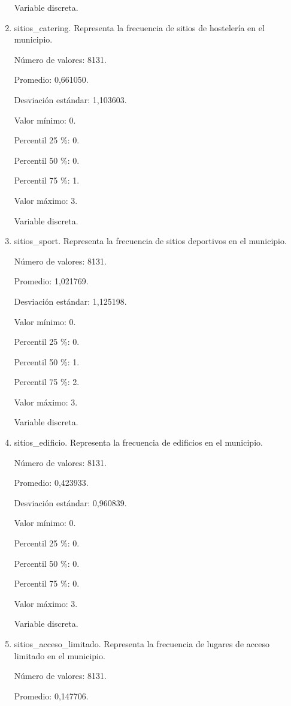 \begin{enumerate}
	Variable discreta.

	\item sitios\_catering. Representa la frecuencia de sitios de hostelería en el municipio.
	
	Número de valores: 8131.
	
	Promedio: 0,661050.
	
	Desviación estándar: 1,103603.
	
	Valor mínimo: 0.
	
	Percentil 25 \%: 0.
	
	Percentil 50 \%: 0.
	
	Percentil 75 \%: 1.
	
	Valor máximo: 3.
	
	Variable discreta.

	\item sitios\_sport. Representa la frecuencia de sitios deportivos en el municipio.
	
	Número de valores: 8131.
	
	Promedio: 1,021769.
	
	Desviación estándar: 1,125198.
	
	Valor mínimo: 0.
	
	Percentil 25 \%: 0.
	
	Percentil 50 \%: 1.
	
	Percentil 75 \%: 2.
	
	Valor máximo: 3.
	
	Variable discreta.

	\item sitios\_edificio. Representa la frecuencia de edificios en el municipio.
	
	Número de valores: 8131.
	
	Promedio: 0,423933.
	
	Desviación estándar: 0,960839.
	
	Valor mínimo: 0.
	
	Percentil 25 \%: 0.
	
	Percentil 50 \%: 0.
	
	Percentil 75 \%: 0.
	
	Valor máximo: 3.
	
	Variable discreta.

	\item sitios\_acceso\_limitado. Representa la frecuencia de lugares de acceso limitado en el municipio.
	
	Número de valores: 8131.
	
	Promedio: 0,147706.
	

\end{enumerate}
